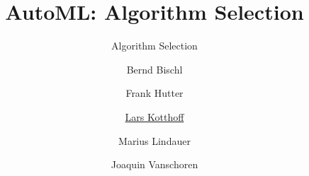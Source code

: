 



\title[AutoML: Overview]{AutoML: Algorithm Selection} %
\subtitle{Algorithm Selection} %
\author[Lars Kotthoff]{Bernd Bischl \and Frank Hutter \and \underline{Lars Kotthoff}\newline \and Marius Lindauer \and Joaquin Vanschoren}
\institute{}
\date{}





	
	\maketitle
	

